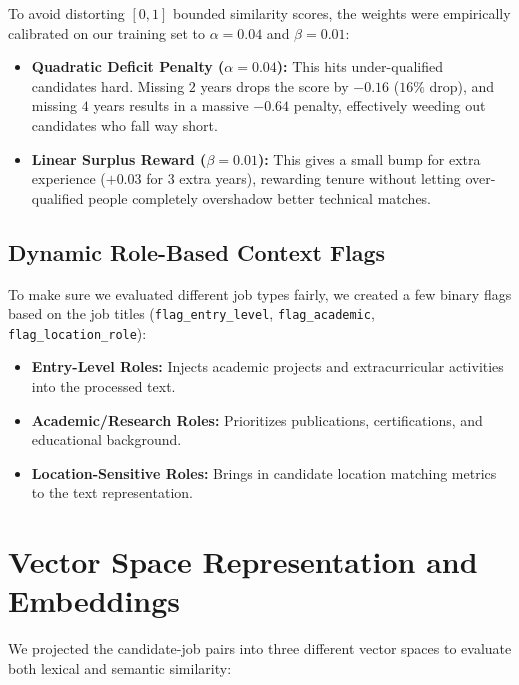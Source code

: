 \documentclass[12pt,a4paper,oneside]{report}
\begin{document}
To avoid distorting $[0, 1]$ bounded similarity scores, the weights were empirically calibrated on our training set to \textbf{$\alpha = 0.04$} and \textbf{$\beta = 0.01$}:

\begin{itemize}
    \item \textbf{Quadratic Deficit Penalty ($\alpha = 0.04$):} This hits under-qualified candidates hard. Missing $2$ years drops the score by $-0.16$ ($16\%$ drop), and missing $4$ years results in a massive $-0.64$ penalty, effectively weeding out candidates who fall way short.
    
    \item \textbf{Linear Surplus Reward ($\beta = 0.01$):} This gives a small bump for extra experience ($+0.03$ for $3$ extra years), rewarding tenure without letting over-qualified people completely overshadow better technical matches.
\end{itemize}

\subsection{Dynamic Role-Based Context Flags}
To make sure we evaluated different job types fairly, we created a few binary flags based on the job titles (\texttt{flag\_entry\_level}, \texttt{flag\_academic}, \texttt{flag\_location\_role}):
\begin{itemize}
    \item \textbf{Entry-Level Roles:} Injects academic projects and extracurricular activities into the processed text.
    \item \textbf{Academic/Research Roles:} Prioritizes publications, certifications, and educational background.
    \item \textbf{Location-Sensitive Roles:} Brings in candidate location matching metrics to the text representation.
\end{itemize}

\section{Vector Space Representation and Embeddings}
We projected the candidate-job pairs into three different vector spaces to evaluate both lexical and semantic similarity:
\end{document}
